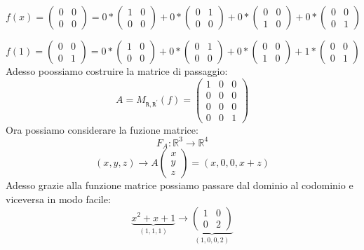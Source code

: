 $$ f(x) = \begin{pmatrix}0 & 0 \\ 0 & 0 \end{pmatrix} = 0*\begin{pmatrix}
1 & 0 \\ 0 & 0
\end{pmatrix}
+0*
\begin{pmatrix}
0 & 1 \\ 0 & 0
\end{pmatrix}
+0*
\begin{pmatrix}
0 & 0 \\ 1 & 0
\end{pmatrix}
+0*
\begin{pmatrix}
0 & 0 \\ 0 & 1
\end{pmatrix} $$

$$ f(1) = \begin{pmatrix}0 & 0 \\ 0 & 1 \end{pmatrix} = 0*\begin{pmatrix}
1 & 0 \\ 0 & 0
\end{pmatrix}
+0*
\begin{pmatrix}
0 & 1 \\ 0 & 0
\end{pmatrix}
+0*
\begin{pmatrix}
0 & 0 \\ 1 & 0
\end{pmatrix}
+1*
\begin{pmatrix}
0 & 0 \\ 0 & 1
\end{pmatrix} $$
Adesso poossiamo costruire la matrice di passaggio:
$$
A = M_{\mathtt{R},\mathtt{R}^{\prime}}(f) = 
\begin{pmatrix}
1 & 0 & 0 \\
0 & 0 & 0 \\
0 & 0 & 0 \\
0 & 0 & 1 
\end{pmatrix}
$$
Ora possiamo considerare la fuzione matrice:
$$ F_A: \mathbb{R}^3 \rightarrow \mathbb{R}^4 $$
$$ (x,y,z) \rightarrow A \begin{pmatrix}x \\ y \\ z \end{pmatrix} = (x,0,0,x+z)$$
Adesso grazie alla funzione matrice possiamo passare dal dominio al codominio e viceversa in modo facile:
$$ \underbrace{x^2+x+1}_{(1,1,1)} \rightarrow \underbrace{\begin{pmatrix}1 & 0 \\ 0 & 2\end{pmatrix}}_{(1,0,0,2)}  $$ 




